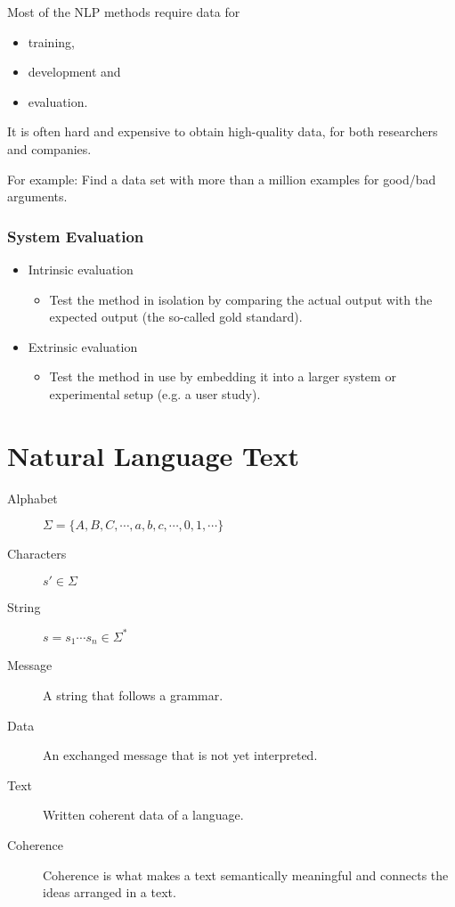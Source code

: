             Most of the NLP methods require data for
            \begin{itemize}
            	\item training,
            	\item development and
            	\item evaluation.
            \end{itemize}
        	It is often hard and expensive to obtain high-quality data, for both researchers and companies.
        	
        	For example: Find a data set with more than a million examples for good/bad arguments.

        \subsection{System Evaluation} %
            \begin{itemize}
            	\item Intrinsic evaluation
            		\begin{itemize}
            			\item Test the method in isolation by comparing the actual output with the expected output (the so-called gold standard).
            		\end{itemize}
            	\item Extrinsic evaluation
            		\begin{itemize}
            			\item Test the method in use by embedding it into a larger system or experimental setup (e.g. a user study).
            		\end{itemize}
            \end{itemize}

\chapter{Natural Language Text} %
    \begin{description}
    	\item[Alphabet] \( \Sigma = \{ A, B, C, \cdots, a, b, c, \cdots, 0, 1, \cdots \} \)
    	\item[Characters] \( s'\in \Sigma \)
    	\item[String] \( s = s_1 \cdots s_n \in \Sigma^* \)
    	\item[Message] A string that follows a grammar.
    	\item[Data] An exchanged message that is not yet interpreted.
    	\item[Text] Written coherent data of a language.
    	\item[Coherence] Coherence is what makes a text semantically meaningful and connects the ideas arranged in a text.
    \end{description}

